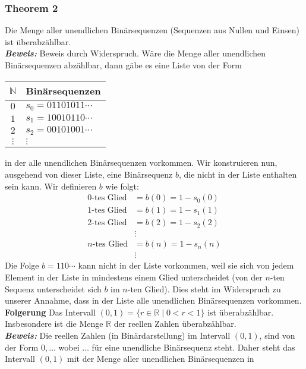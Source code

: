 \subsubsection{Theorem 2}%
\label{ssub:theorem_2}
Die Menge aller unendlichen Binärsequenzen (Sequenzen aus Nullen und Einsen) ist überabzählbar. \\
\textbf{\textit{Beweis: }}
Beweis durch Widerspruch. Wäre die Menge aller unendlichen Binärsequenzen abzählbar, dann gäbe es eine Liste von der Form
\begin{center}
	\begin{tabular}{c|l}
		$\mathbb{N}$ & Binärsequenzen       \\
		\hline
		$0$          & $s_0=01101011\cdots$ \\
		$1$          & $s_1=10010110\cdots$ \\
		$2$          & $s_2=00101001\cdots$ \\
		$\vdots$     & $\vdots$
	\end{tabular}
\end{center}
in der alle unendlichen Binärsequenzen vorkommen. Wir konstruieren nun, ausgehend von dieser Liste, eine Binärsequenz $b$, die nicht in der Liste enthalten sein kann. Wir definieren $b$ wie folgt:
\begin{align*}
	0\text{-tes Glied} & =b(0)=1-s_0(0) \\
	1\text{-tes Glied} & =b(1)=1-s_1(1) \\
	2\text{-tes Glied} & =b(2)=1-s_2(2) \\
	                   & \vdots         \\
	n\text{-tes Glied} & =b(n)=1-s_n(n) \\
	                   & \vdots
\end{align*}
Die Folge $b=110\cdots$ kann nicht in der Liste vorkommen, weil sie sich von jedem Element in der Liste in mindestens
einem Glied unterscheidet (von der $n$-ten Sequenz unterscheidet sich $b$ im $n$-ten Glied). Dies steht im Widerspruch
zu unserer Annahme, dass in der Liste alle unendlichen Binärsequenzen vorkommen.\\
\textbf{Folgerung }
Das Intervall $(0,1)=\{r\in\mathbb{R}\mid 0<r<1 \}$ ist überabzählbar. Insbesondere ist die Menge $\mathbb{R}$ der reellen Zahlen
überabzählbar.\\
\textbf{\textit{Beweis: }}
Die reellen Zahlen (in Binärdarstellung) im Intervall $(0,1)$, sind von der Form $0,\dots$ wobei $\dots$ für eine
unendliche Binärsequenz steht. Daher steht das Intervall $(0,1)$ mit der Menge aller unendlichen Binärsequenzen in
